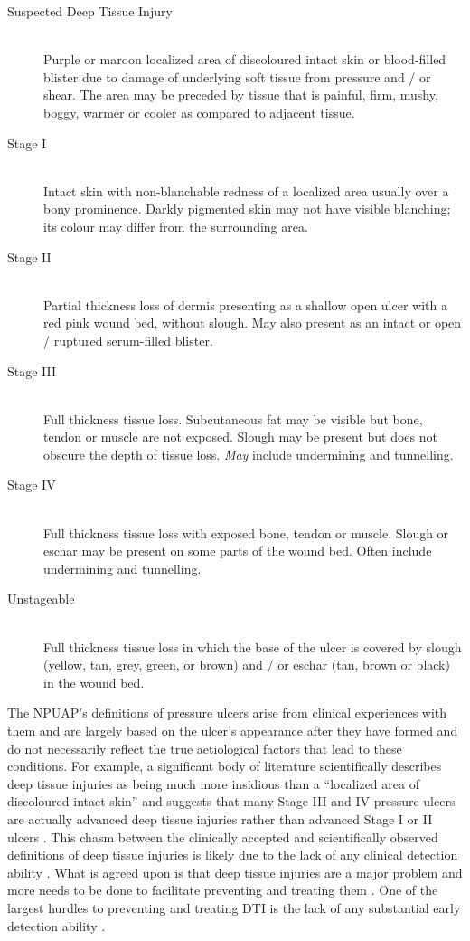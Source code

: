 		\begin{description}
			\item[Suspected Deep Tissue Injury] \hfill \\
				Purple or maroon localized area of discoloured intact skin or blood-filled blister due to damage of underlying soft tissue from pressure and / or shear. The area may be preceded by tissue that is painful, firm, mushy, boggy, warmer or cooler as compared to adjacent tissue.
			\item[Stage I] \hfill \\
				Intact skin with non-blanchable redness of a localized area usually over a bony prominence. Darkly pigmented skin may not have visible blanching; its colour may differ from the surrounding area.
			\item[Stage II] \hfill \\
				Partial thickness loss of dermis presenting as a shallow open ulcer with a red pink wound bed, without slough. May also present as an intact or open / ruptured serum-filled blister.
			\item[Stage III] \hfill \\
				Full thickness tissue loss. Subcutaneous fat may be visible but bone, tendon or muscle are not exposed. Slough may be present but does not obscure the depth of tissue loss. \emph{May} include undermining and tunnelling.
			\item[Stage IV] \hfill \\
				Full thickness tissue loss with exposed bone, tendon or muscle. Slough or eschar may be present on some parts of the wound bed. Often include undermining and tunnelling.
			\item[Unstageable] \hfill \\
				Full thickness tissue loss in which the base of the ulcer is covered by slough (yellow, tan, grey, green, or brown) and / or eschar (tan, brown or black) in the wound bed.
		\end{description}

		The NPUAP's definitions of pressure ulcers arise from clinical experiences with them and are largely based on the ulcer's appearance after they have formed and do not necessarily reflect the true aetiological factors that lead to these conditions. For example, a significant body of literature scientifically describes deep tissue injuries as being much more insidious than a ``localized area of discoloured intact skin'' and suggests that many Stage III and IV pressure ulcers are actually advanced deep tissue injuries rather than advanced Stage I or II ulcers \cite{gefen09}. This chasm between the clinically accepted and scientifically observed definitions of deep tissue injuries is likely due to the lack of any clinical detection ability \cite{campbell10}. What is agreed upon is that deep tissue injuries are a major problem and more needs to be done to facilitate preventing and treating them \cite{black11,maklebust05}. One of the largest hurdles to preventing and treating DTI is the lack of any substantial early detection ability \cite{gunningberg08,milne09}.

